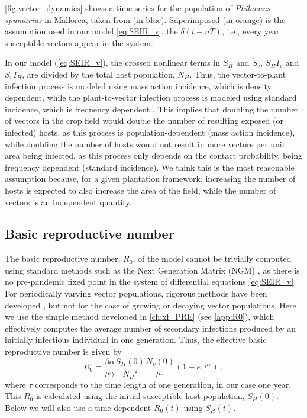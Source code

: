 \cref{fig:vector_dynamics} shows a time series
for the population of \textit{Philaenus spumarius} in Mallorca, taken from
\cite{Lopez2021} (in blue). Superimposed (in orange) is the assumption used in
our model \cref{eq:SEIR_v}, the $\delta(t-nT)$, i.e., every year susceptible
vectors appear in the system.

In our model (\cref{eq:SEIR_v}), the crossed nonlinear terms in $\dot{S}_H$
and $\dot{S}_v$, $S_H I_v$ and $S_v I_H$, are divided by the total host
population, $N_H$. Thus, the vector-to-plant infection process is modeled using
mass action incidence, which is density dependent, while the plant-to-vector
infection process is modeled using standard incidence, which is frequency
dependent \cite{MartchevaBook}. This implies that doubling the number of
vectors in the crop field would double the number of resulting exposed (or
infected) hosts, as this process is population-dependent (mass action
incidence), while doubling the number of hosts would not result in more vectors
per unit area being infected, as this process only depends on the contact
probability, being frequency dependent (standard incidence). We think this is
the most reasonable assumption because, for a given plantation framework,
increasing the number of hosts is expected to also increase the area of the
field, while the number of vectors is an independent quantity.

\subsection{Basic reproductive number}

The basic reproductive number, $R_0$, of the model cannot be trivially
computed using standard methods such as the Next Generation Matrix (NGM)
\cite{Diekmann2010}, as there is no pre-pandemic fixed point in the system of
differential equations \cref{eq:SEIR_v}. For periodically varying vector
populations, rigorous methods have been developed \cite{Bacaer2007}, but not
for the case of growing or decaying vector populations. Here we use the simple
method developed in \cref{ch:xf_PRE} \cite{GimenezRomero2022_PRE} (see
\cref{app:R0}), which
effectively computes the average number of secondary infections produced by an
initially infectious individual in one generation. Thus, the effective basic
reproductive number is given by
\begin{equation}\label{eq:R0}
    R_0=\frac{\beta\alpha}{\mu\gamma}\frac{S_H(0)}{{N_H}^2}
    \frac{N_v(0)}{\mu\tau}\left(1-e^{-\mu\tau}\right)
    \ ,
\end{equation}
where $\tau$ corresponds to the time length of one generation, in our case
one year. This $R_0$ is calculated using the initial susceptible host
population, $S_H(0)$. Below we will also use a time-dependent $R_0(t)$ using
$S_H(t)$.

